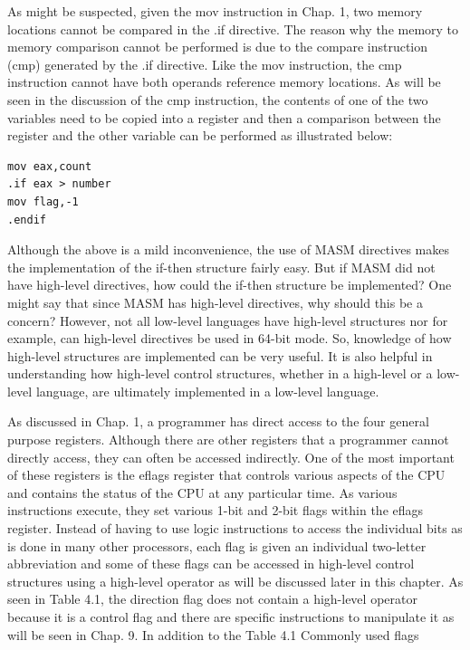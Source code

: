 \documentclass[10pt]{book}
\begin{document}
As might be suspected, given the mov instruction in Chap. 1, two memory locations cannot be compared in the .if directive. The reason why the memory to memory comparison cannot be performed is due to the compare instruction (cmp) generated by the .if directive. Like the mov instruction, the cmp instruction cannot have both operands reference memory locations. As will be seen in the discussion of the cmp instruction, the contents of one of the two variables need to be copied into a register and then a comparison between the register and the other variable can be performed as illustrated below:

\begin{verbatim}
mov eax,count
.if eax > number
mov flag,-1
.endif
\end{verbatim}

Although the above is a mild inconvenience, the use of MASM directives makes the implementation of the if-then structure fairly easy. But if MASM did not have high-level directives, how could the if-then structure be implemented? One might say that since MASM has high-level directives, why should this be a concern? However, not all low-level languages have high-level structures nor for example, can high-level directives be used in 64-bit mode. So, knowledge of how high-level structures are implemented can be very useful. It is also helpful in understanding how high-level control structures, whether in a high-level or a low-level language, are ultimately implemented in a low-level language.

As discussed in Chap. 1, a programmer has direct access to the four general purpose registers. Although there are other registers that a programmer cannot directly access, they can often be accessed indirectly. One of the most important of these registers is the eflags register that controls various aspects of the CPU and contains the status of the CPU at any particular time. As various instructions execute, they set various 1-bit and 2-bit flags within the eflags register. Instead of having to use logic instructions to access the individual bits as is done in many other processors, each flag is given an individual two-letter abbreviation and some of these flags can be accessed in high-level control structures using a high-level operator as will be discussed later in this chapter. As seen in Table 4.1, the direction flag does not contain a high-level operator because it is a control flag and there are specific instructions to manipulate it as will be seen in Chap. 9. In addition to the
Table 4.1 Commonly used flags
\end{document}
